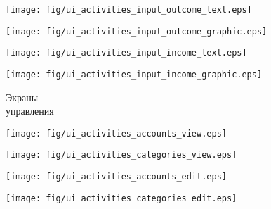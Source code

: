 \documentclass[russian,utf8,a1paper,nostitching,simple]{eskdgraph}
\begin{document}
\begin{ESKDdrawing}
\begin{minipage}{17cm}
    \vspace{2cm}
    \begin{minipage}{7.5cm}
      \centering

      \vspace{1cm}
      \centering
      \texttt{[image: fig/ui\_activities\_input\_outcome\_text.eps]}

      \vspace{2cm}
      \centering
      \texttt{[image: fig/ui\_activities\_input\_outcome\_graphic.eps]}
    \end{minipage}
    \hfill
    \begin{minipage}{7.5cm}
      \centering

      \vspace{1cm}
      \centering
      \texttt{[image: fig/ui\_activities\_input\_income\_text.eps]}

      \vspace{2cm}
      \centering
      \texttt{[image: fig/ui\_activities\_input\_income\_graphic.eps]}
    \end{minipage}
  \end{minipage}
  \hfill
  \begin{minipage}{28cm}
    \centering
    {\fontsize{40}{50}\selectfont Экраны \\ управления}

    \vspace{2cm}
    \begin{minipage}{7.5cm}
      \centering

      \vspace{1cm}
      \centering
      \texttt{[image: fig/ui\_activities\_accounts\_view.eps]}

      \vspace{2cm}
      \centering
      \texttt{[image: fig/ui\_activities\_categories\_view.eps]}
    \end{minipage}
    \hfill
    \begin{minipage}{7.5cm}
      \centering
      \vspace{1cm}

      \centering
      \texttt{[image: fig/ui\_activities\_accounts\_edit.eps]}

      \vspace{2cm}
      \centering
      \texttt{[image: fig/ui\_activities\_categories\_edit.eps]}
    \end{minipage}
    \hfill
    \begin{minipage}{10cm}
      \vspace{4.5cm}


\end{minipage}
\end{minipage}
\end{ESKDdrawing}
\end{document}
